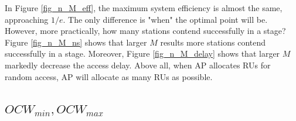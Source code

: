 \documentclass[journal]{IEEEtran}
\begin{document}
In Figure \ref{fig_n_M_eff}, the maximum system efficiency is almost the same, approaching $1/e$. 
The only difference is "when" the optimal point will be. 
However, more practically, how many stations contend successfully in a stage?
Figure \ref{fig_n_M_ns} shows that larger $M$ results more stations contend successfully in a stage.
Moreover, Figure \ref{fig_n_M_delay} shows that larger $M$ markedly decrease the access delay. 
Above all, when AP allocates RUs for random access, AP will allocate as many RUs as possible.



\subsection{$OCW_{min}, OCW_{max}$}
\label{contend_window}
\end{document}
